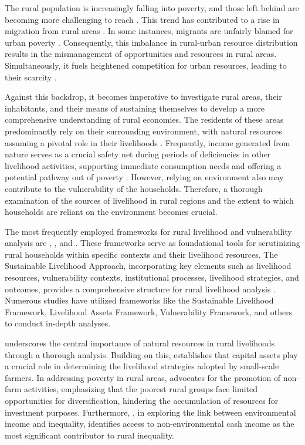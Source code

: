 \documentclass[12pt, a4paper]{article}
\begin{document}
The rural population is increasingly falling into poverty, and those left behind are becoming more challenging to reach \citep{UN2019}. This trend has contributed to a rise in migration from rural areas \citep{lazarte2017understanding}. In some instances, migrants are unfairly blamed for urban poverty \citep{tacoli2015rural}. Consequently, this imbalance in rural-urban resource distribution results in the mismanagement of opportunities and resources in rural areas. Simultaneously, it fuels heightened competition for urban resources, leading to their scarcity \citep{artuso2011state}. 

Against this backdrop, it becomes imperative to investigate rural areas, their inhabitants, and their means of sustaining themselves to develop a more comprehensive understanding of rural economies. The residents of these areas predominantly rely on their surrounding environment, with natural resources assuming a pivotal role in their livelihoods \citep{nawrotzki2012natural}. Frequently, income generated from nature serves as a crucial safety net during periods of deficiencies in other livelihood activities, supporting immediate consumption needs and offering a potential pathway out of poverty \citep{angelsen2003exploring}. However, relying on environment also may contribute to the vulnerability of the households. Therefore, a thorough examination of the sources of livelihood in rural regions and the extent to which households are reliant on the environment becomes crucial.
 
 The most frequently employed frameworks for rural livelihood and vulnerability analysis are \cite{anani1999sustainable}, \cite{dfid1999sustainable}, and \cite{ellis1999rural}. These frameworks serve as foundational tools for scrutinizing rural households within specific contexts and their livelihood resources. The Sustainable Livelihood Approach, incorporating key elements such as livelihood resources, vulnerability contexts, institutional processes, livelihood strategies, and outcomes, provides a comprehensive structure for rural livelihood analysis \citep{walelign2017dynamics}. Numerous studies have utilized frameworks like the Sustainable Livelihood Framework, Livelihood Assets Framework, Vulnerability Framework, and others to conduct in-depth analyses.

\cite{nawrotzki2012natural} underscores the central importance of natural resources in rural livelihoods through a thorough analysis. Building on this, \cite{diaz2019livelihood} establishes that capital assets play a crucial role in determining the livelihood strategies adopted by small-scale farmers. In addressing poverty in rural areas, \cite{mukotami2014rural} advocates for the promotion of non-farm activities, emphasizing that the poorest rural groups face limited opportunities for diversification, hindering the accumulation of resources for investment purposes. Furthermore, \cite{cavendish2008poverty}, in exploring the link between environmental income and inequality, identifies access to non-environmental cash income as the most significant contributor to rural inequality.
\end{document}

